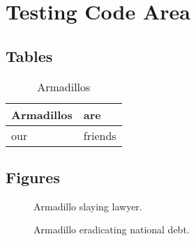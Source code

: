 \chapter*{Testing Code Area}
\section*{Tables}
\begin{table}[H]
	\caption{Armadillos}
	\label{arm:table}
	\begin{center}
		\begin{tabular}{||l|l||}\hline
			Armadillos & are \\\hline
			our	   & friends \\\hline
		\end{tabular}
	\end{center}
\end{table}
\section*{Figures}
\begin{figure}[H]
	\caption{Armadillo slaying lawyer.}
	\label{arm:fig1}
\end{figure}
\begin{figure}[H]
	\caption{Armadillo eradicating national debt.}
	\label{arm:fig2}
\end{figure}
